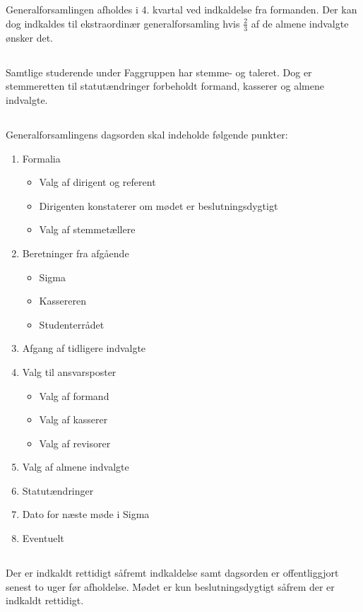 \documentclass[danish,a4paper,twocolumn]{article}
\newcommand{\foreningen}{Sigma}
\begin{document}
\subsection{}Generalforsamlingen afholdes i 4. kvartal ved indkaldelse fra formanden. Der kan dog indkaldes til ekstraordinær generalforsamling hvis $\frac{2}{3}$ af de almene indvalgte ønsker det.
\subsection{}Samtlige studerende under Faggruppen har stemme- og taleret. Dog er stemmeretten til statutændringer forbeholdt formand, kasserer og almene indvalgte.
\subsection{}Generalforsamlingens dagsorden skal indeholde følgende punkter:
\begin{enumerate}
\item Formalia
  \begin{itemize}
  \item Valg af dirigent og referent
  \item Dirigenten konstaterer om mødet er beslutningsdygtigt
  \item Valg af stemmetællere
  \end{itemize}
\item Beretninger fra afgående
  \begin{itemize}
  \item \foreningen
  \item Kassereren
  \item Studenterrådet
  \end{itemize}
\item Afgang af tidligere indvalgte
\item Valg til ansvarsposter
  \begin{itemize}
      \item Valg af formand
      \item Valg af kasserer
      \item Valg af revisorer
  \end{itemize}
\item Valg af almene indvalgte
\item Statutændringer
\item Dato for næste møde i \foreningen
\item Eventuelt
\end{enumerate}
\subsection{}Der er indkaldt rettidigt såfremt indkaldelse samt dagsorden er offentliggjort senest to uger før afholdelse. Mødet er kun beslutningsdygtigt såfrem der er indkaldt rettidigt.
\end{document}
